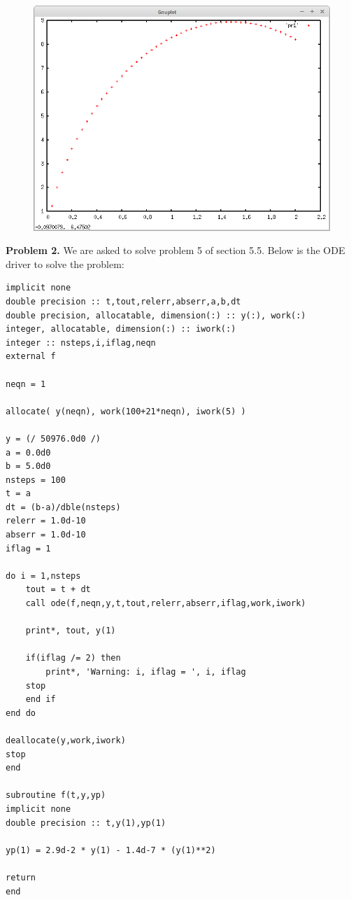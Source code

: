 \documentclass[12pt]{article}
\begin{document}
\begin{figure}[htbp]
	\centering
		\includegraphics[width=1.00\textwidth]{hw7pr1graph.png}
	\label{fig:hw7pr1graph}
\end{figure}

\textbf{Problem 2.} We are asked to solve problem 5 of section 5.5. Below is the ODE driver to solve the problem:

\begin{verbatim}
implicit none
double precision :: t,tout,relerr,abserr,a,b,dt
double precision, allocatable, dimension(:) :: y(:), work(:)
integer, allocatable, dimension(:) :: iwork(:)
integer :: nsteps,i,iflag,neqn
external f

neqn = 1

allocate( y(neqn), work(100+21*neqn), iwork(5) )

y = (/ 50976.0d0 /)
a = 0.0d0
b = 5.0d0
nsteps = 100
t = a
dt = (b-a)/dble(nsteps)
relerr = 1.0d-10
abserr = 1.0d-10
iflag = 1

do i = 1,nsteps
	tout = t + dt
	call ode(f,neqn,y,t,tout,relerr,abserr,iflag,work,iwork)
	
	print*, tout, y(1)
	
	if(iflag /= 2) then
		print*, 'Warning: i, iflag = ', i, iflag
	stop
	end if
end do

deallocate(y,work,iwork)
stop
end

subroutine f(t,y,yp)
implicit none
double precision :: t,y(1),yp(1)

yp(1) = 2.9d-2 * y(1) - 1.4d-7 * (y(1)**2)

return
end
\end{verbatim}
\end{document}
